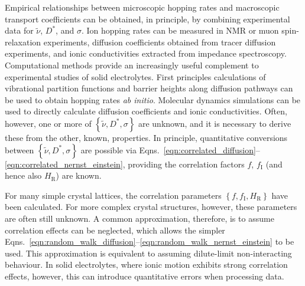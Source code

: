 \documentclass[aps,prb,twocolumn,superscriptaddress,reprint]{revtex4-1}
\newcommand{\set}[1]{\left\{#1\right\}}
\newcommand{\hrpa}{{\widetilde{\nu}}}
\newcommand{\m}[1]{\mathrm{#1}}
\begin{document}
Empirical relationships between microscopic hopping rates and macroscopic transport coefficients can be obtained, in principle, by combining experimental data for $\hrpa$, $D^*$, and $\sigma$. 
Ion hopping rates can be measured in NMR or muon spin-relaxation experiments,\cite{WilkeningEtAl_PhysRevLett2006, RuprechtEtAl_PhysChemChemPhys2012, Enciso-MaldonadoEtAl_ChemMater2015,Santibanez-MendietaEtAl_ChemMater2016, NozakiEtAl_SolStatIonics2014,AmoresEtAl_JMaterChemA2016} diffusion coefficients obtained from tracer diffusion experiments,\cite{BaylissEtAl_AdvEnergyMater2014} and ionic conductivities extracted from impedance spectroscopy.\cite{ZeierEtAl_ACSApplMaterInt2014,Lopez-BermudezEtAl_2016} Computational methods provide an increasingly useful complement to experimental studies of solid electrolytes. 
First principles calculations of vibrational partition functions and barrier heights along diffusion pathways can be used to obtain hopping rates \emph{ab initio}.\cite{VanDerVenEtAl_PhysRevB2001, MantinaEtAl_PhysRevLett2008} Molecular dynamics simulations can be used to directly calculate diffusion coefficients and ionic conductivities.\cite{MorganAndMadden_JPhysCondensMat2012} Often, however, one or more of $\set{\hrpa,D^*,\sigma}$ are unknown, and it is necessary to derive these from the other, known, properties. In principle, quantitative conversions between $\set{\hrpa,D^*,\sigma}$ are possible via Eqns.~\ref{eqn:correlated_diffusion}--\ref{eqn:correlated_nernst_einstein}, providing the correlation factors $f$, $f_\m{I}$ (and hence also $H_\m{R}$) are known.

For many simple crystal lattices, the correlation parameters $\set{f, f_\m{I}, H_\m{R}}$ have been calculated.\cite{Friauf_JApplPhys1962,Murch_SolStatIonics1982} For more complex crystal structures, however, these parameters are often still unknown. A common approximation, therefore, is to assume correlation effects can be neglected, which allows the simpler Eqns.~\ref{eqn:random_walk_diffusion}--\ref{eqn:random_walk_nernst_einstein} to be used. This approximation is equivalent to assuming dilute-limit non-interacting behaviour. In solid electrolytes, where ionic motion exhibits strong correlation effects, however, this can introduce quantitative errors when processing data.
\end{document}
